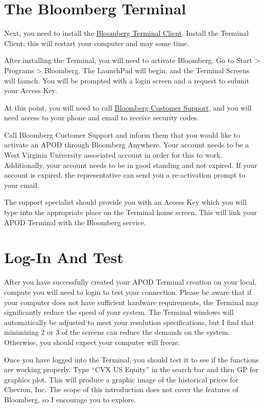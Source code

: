\documentclass[]{book}
\begin{document}
\section{The Bloomberg Terminal}\label{the-bloomberg-terminal}

Next, you need to install the
\href{https://www.bloomberg.com/professional/download/2183/}{Bloomberg
Terminal Client}. Install the Terminal Client; this will restart your
computer and may some time.

After installing the Terminal, you will need to activate Bloomberg. Go
to Start \textgreater{} Programs \textgreater{} Bloomberg. The LaunchPad
will begin, and the Terminal Screens will launch. You will be prompted
with a login screen and a request to submit your Access Key.

At this point, you will need to call
\href{https://www.bloomberg.com/professional/support/support-numbers/}{Bloomberg
Customer Support}, and you will need access to your phone and email to
receive security codes.

Call Bloomberg Customer Support and inform them that you would like to
activate an APOD through Bloomberg Anywhere. Your account needs to be a
West Virginia University associated account in order for this to work.
Additionally, your account needs to be in good standing and not expired.
If your account is expired, the representative can send you a
re-activation prompt to your email.

The support specialist should provide you with an Access Key which you
will type into the appropriate place on the Terminal home screen. This
will link your APOD Terminal with the Bloomberg service.

\section{Log-In And Test}\label{log-in-and-test}

After you have successfully created your APOD Terminal creation on your
local, compute you will need to login to test your connection. Please be
aware that if your computer does not have sufficient hardware
requirements, the Terminal may significantly reduce the speed of your
system. The Terminal windows will automatically be adjusted to meet your
resolution specifications, but I find that minimizing 2 or 3 of the
screens can reduce the demands on the system. Otherwise, you should
expect your computer will freeze.

Once you have logged into the Terminal, you should test it to see if the
functions are working properly. Type ``CVX US Equity'' in the search bar
and then GP for graphics plot. This will produce a graphic image of the
historical prices for Chevron, Inc. The scope of this introduction does
not cover the features of Bloomberg, so I encourage you to explore.
\end{document}
